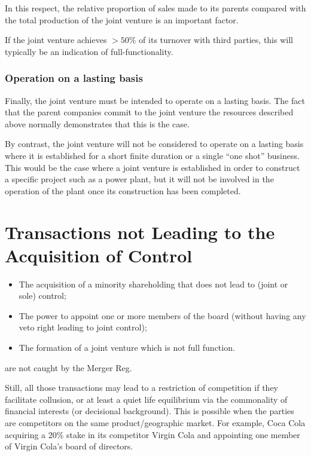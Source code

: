             In this respect, the relative proportion of sales made to its parents compared with the total production of the joint venture is an important factor. 

            If the joint venture achieves \(> 50\%\) of its turnover with third parties, this will typically be an indication of full-functionality.

        \subsubsection{Operation on a lasting basis}

            Finally, the joint venture must be intended to operate on a lasting basis. The fact that the parent companies commit to the joint venture the resources described above normally demonstrates that this is the case. 
            
            By contrast, the joint venture will not be considered to operate on a lasting basis where it is established for a short finite duration or a single “one shot” business. This would be the case where a joint venture is established in order to construct a specific project such as a power plant, but it will not be involved in the operation of the plant once its construction has been completed.

\newpage
\section{Transactions not Leading to the Acquisition of Control}

    \begin{itemize}
        \item The acquisition of a minority shareholding that does not lead to (joint or sole) control;
        \item The power to appoint one or more members of the board (without having any veto right leading to joint control);
        \item The formation of a joint venture which is not full function.
    \end{itemize}

    are not caught by the Merger Reg. 
    
    Still, all those transactions may lead to a restriction of competition if they facilitate collusion, or at least a quiet life equilibrium via the commonality of financial interests (or decisional background). This is possible when the parties are competitors on the same product/geographic market. For example, Coca Cola acquiring a 20\% stake in its competitor Virgin Cola and appointing one member of Virgin Cola’s board of directors.

